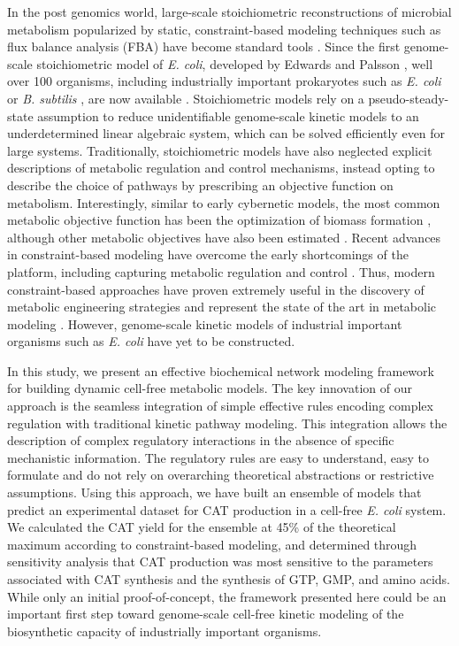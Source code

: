 \documentclass[12pt]{article}
\begin{document}
In the post genomics world, large-scale stoichiometric reconstructions of microbial metabolism popularized by static, constraint-based modeling techniques such as flux balance analysis (FBA) have become standard tools \citep{2012_lewis_palsson_NatRevMicrobio}.
Since the first genome-scale stoichiometric model of \textit{E. coli}, developed by Edwards and Palsson \citep{2000_edwards_palsson_PNAS}, well over 100 organisms, including industrially important prokaryotes such as \textit{E. coli} \citep{Feist:2007aa} or \textit{B. subtilis} \citep{Oh:2007aa}, are now available \citep{2009_feist_palsson_NatRevMicrobio}.
Stoichiometric models rely on a pseudo-steady-state assumption to reduce unidentifiable genome-scale kinetic models to an underdetermined linear algebraic system, which can be solved efficiently even for large systems.
Traditionally, stoichiometric models have also neglected explicit descriptions of metabolic regulation and control mechanisms, instead opting to describe the choice of pathways by prescribing an objective function on metabolism.
Interestingly, similar to early cybernetic models, the most common metabolic objective function has been the optimization of biomass formation \citep{2002_ibarra_edwards_palsson_Nat}, although other metabolic objectives have also been estimated \citep{2007_schuetz_sauer_MolSysBio}.
Recent advances in constraint-based modeling have overcome the early shortcomings of the platform, including capturing metabolic regulation and control \citep{2013_hyduke_lewis_palsson_MolBioSys}.
Thus, modern constraint-based approaches have proven extremely useful in the discovery of metabolic engineering strategies and represent the state of the art in metabolic modeling \citep{2013_mccloskey_palsson_feist_MolSysBio, 2012_zomorrodi_maranas_MetaEng}.
However, genome-scale kinetic models of industrial important organisms such as \textit{E. coli} have yet to be constructed.

In this study, we present an effective biochemical network modeling framework for building dynamic cell-free metabolic models.
The key innovation of our approach is the seamless integration of simple effective rules encoding complex regulation with traditional kinetic pathway modeling.
This integration allows the description of complex regulatory interactions in the absence of specific mechanistic information.
The regulatory rules are easy to understand, easy to formulate and do not rely on overarching theoretical abstractions or restrictive assumptions.
Using this approach, we have built an ensemble of models that predict an experimental dataset for CAT production in a cell-free \textit{E. coli} system.
We calculated the CAT yield for the ensemble at 45\% of the theoretical maximum according to constraint-based modeling, and determined through sensitivity analysis that CAT production was most sensitive to the parameters associated with CAT synthesis and the synthesis of GTP, GMP, and amino acids.
While only an initial proof-of-concept, the framework presented here could be an important first step toward genome-scale cell-free kinetic modeling of the biosynthetic capacity of industrially important organisms.
\end{document}
